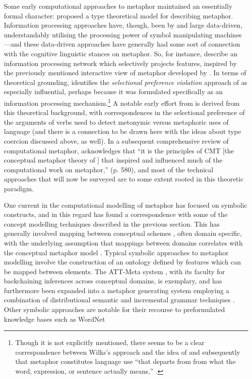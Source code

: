 Some early computational approaches to metaphor maintained an essentially formal character: \cite{vanGenabith2001} proposed a type theoretical model for describing metaphor.  Information processing approaches have, though, been by and large data-driven, understandably utilising the processing power of symbol manipulating machines---and these data-driven approaches have generally had some sort of connection with the cognitive linguistic stances on metaphor.  So, for instance, \cite{ThomasEA1999} describe an information processing network which selectively projects features, inspired by the previously mentioned interactive view of metaphor developed by \cite{Black1977}.  In terms of theoretical grounding, \cite{Shutova2010} identifies the \emph{selectional preference violation} approach of \cite{Wilks1978} as especially influential, perhaps because it was formulated specifically as an information processing mechanism.\footnote{Though it is not explicitly mentioned, there seems to be a clear correspondence between Wilks's approach and the idea of \cite{Grice} and subsequently \cite{Searle1979} that metaphor constitutes language use ``that departs from from what the word, expression, or sentence actually means,'' \citep[][p. 84]{Searle1979}.}  A notable early effort from \cite{Fass1991} is derived from this theoretical background, with correspondences in the selectional preference of the arguments of verbs used to detect metonymic versus metaphoric uses of language (and there is a connection to be drawn here with the ideas about type coercion discussed above, as well). In a subsequent comprehensive review of computational metaphor, \cite{Shutova2015} acknowledges that ``it is the principles of CMT [the conceptual metaphor theory of \cite{LakoffEA1980}] that inspired and influenced much of the computational work on metaphor,'' (p. 580), and most of the technical approaches that will now be surveyed are to some extent rooted in this theoretic paradigm.

One current in the computational modelling of metaphor has focused on symbolic constructs, and in this regard has found a correspondence with some of the concept modelling techniques described in the previous section.  This has generally involved mapping between conceptual schemes \citep{Indurkhya1997}, often domain specific, with the underlying assumption that mappings between domains correlates with the conceptual metaphor model \citep{Narayanan1999}.  Typical symbolic approaches to metaphor modelling involve the construction of an ontology defined by features which can be mapped between elements.  The ATT-Meta system \citep{LeeEA2001}, with its faculty for backchaining inferences across conceptual domains, is exemplary, and has furthermore been expanded into a metaphor generating system employing a combination of distributional semantic and incremental grammar techniques \citep{GargettEA2013}.  Other symbolic approaches are notable for their recourse to preformulated knowledge bases such as WordNet

